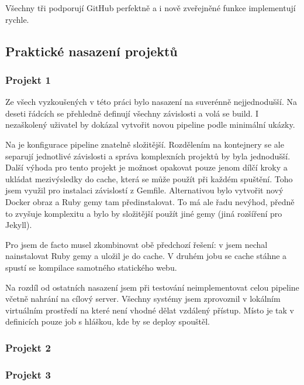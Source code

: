        Všechny tři \CI podporují GitHub perfektně a i nově zveřejněné funkce implementují rychle.

    \subsection{Praktické nasazení projektů}
        \subsubsection{Projekt 1}
            Ze všech \CI vyzkoušených v této práci bylo nasazení na \travis suverénně nejjednodušší. Na deseti řádcích se přehledně definují všechny závislosti a volá se build. I nezaškolený uživatel by dokázal vytvořit novou pipeline podle minimální ukázky.

            Na \circleci je konfigurace pipeline znatelně složitější. Rozdělením na kontejnery se ale separují jednotlivé závislosti a správa komplexních projektů by byla jednodušší. Další výhoda \circleci pro tento projekt je možnost opakovat pouze jenom dílčí kroky a ukládat mezivýsledky do cache, která se může použít při každém spuštění. Toho jsem využil pro instalaci závislostí z Gemfile. Alternativou bylo vytvořit nový Docker obraz a Ruby gemy tam předinstalovat. To má ale řadu nevýhod, předně to zvyšuje komplexitu a bylo by složitější použít jiné gemy (jiná rozšíření pro Jekyll).

            Pro \semaphore jsem de facto musel zkombinovat obě předchozí řešení: v  jsem nechal nainstalovat Ruby gemy a uložil je do cache. V druhém jobu se cache stáhne a spustí se kompilace samotného statického webu.

            Na rozdíl od ostatních nasazení jsem při testování  neimplementovat celou \CI pipeline včetně nahrání na cílový server. Všechny systémy jsem zprovoznil v lokálním virtuálním prostředí na které není vhodné dělat vzdálený přístup. Místo  je tak v definicích pouze job s hláškou, kde by se deploy spouštěl.

        \subsubsection{Projekt 2}
            \blind[2]

        \subsubsection{Projekt 3}
            \blind[2]
